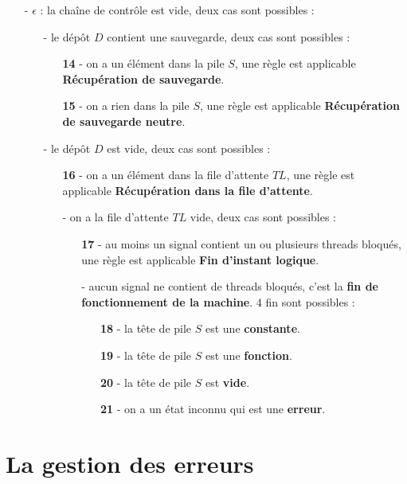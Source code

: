 \documentclass[10pt,a4paper]{report}
\begin{document}
\begin{enumerate}
		\item[-] $\epsilon$ : la chaîne de contrôle est vide, deux cas sont possibles :
		\begin{enumerate}
			\item[-] le dépôt $D$ contient une sauvegarde, deux cas sont possibles :
			\begin{enumerate}
				\item[\textbf{14} -] on a un élément dans la pile $S$, une règle est applicable \textbf{Récupération de sauvegarde}.
				\item[\textbf{15} -] on a rien dans la pile $S$, une règle est applicable \textbf{Récupération de sauvegarde neutre}.  
			\end{enumerate}
			\item[-] le dépôt $D$ est vide, deux cas sont possibles :
			\begin{enumerate}
				\item[\textbf{16} -] on a un élément dans la file d'attente $TL$, une règle est applicable \textbf{Récupération dans la file d'attente}.
				\item[-] on a la file d'attente $TL$ vide, deux cas sont possibles :
				\begin{enumerate}
					\item[\textbf{17} -] au moins un signal contient un ou plusieurs threads bloqués, une règle est applicable \textbf{Fin d'instant logique}.
					\item[-] aucun signal ne contient de threads bloqués, c'est la \textbf{fin de fonctionnement de la machine}. 4 fin sont possibles :
					\begin{itemize}
						\item[\textbf{18} -] la tête de pile $S$ est une \textbf{constante}.
						\item[\textbf{19} -] la tête de pile $S$ est une \textbf{fonction}.
						\item[\textbf{20} -] la tête de pile $S$ est \textbf{vide}.
						\item[\textbf{21} -] on a un état inconnu qui est une \textbf{erreur}.
					\end{itemize}	   	
				\end{enumerate}
			\end{enumerate}
		\end{enumerate}
	\end{enumerate}
	\newpage
	
	
	
	\section{La gestion des erreurs}
	
\end{document}
